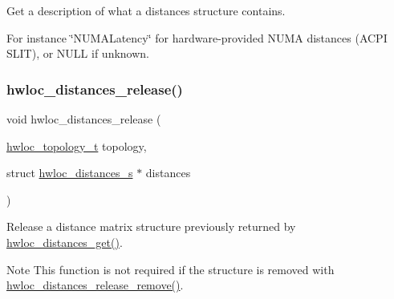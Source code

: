 Get a description of what a distances structure contains. 

For instance \char`\"{}\+N\+U\+M\+A\+Latency\char`\"{} for hardware-\/provided N\+U\+MA distances (A\+C\+PI S\+L\+IT), or N\+U\+LL if unknown. \mbox{\label{a00208_ga1dd78c1f9acd54f26aba0e284e97e51d}} 
\subsubsection{\texorpdfstring{hwloc\+\_\+distances\+\_\+release()}{hwloc\_distances\_release()}}
{\footnotesize\ttfamily void hwloc\+\_\+distances\+\_\+release (\begin{DoxyParamCaption}\item[{\hyperlink{a00186_ga9d1e76ee15a7dee158b786c30b6a6e38}{hwloc\+\_\+topology\+\_\+t}}]{topology,  }\item[{struct \hyperlink{a00310}{hwloc\+\_\+distances\+\_\+s} $\ast$}]{distances }\end{DoxyParamCaption})}



Release a distance matrix structure previously returned by \hyperlink{a00208_ga613e6b2a5d0f06626ee8d0c12fa46691}{hwloc\+\_\+distances\+\_\+get()}. 

\begin{DoxyNote}{Note}
This function is not required if the structure is removed with \hyperlink{a00210_ga80bbf6f0db9af48c61780dd5152664c2}{hwloc\+\_\+distances\+\_\+release\+\_\+remove()}. 
\end{DoxyNote}

